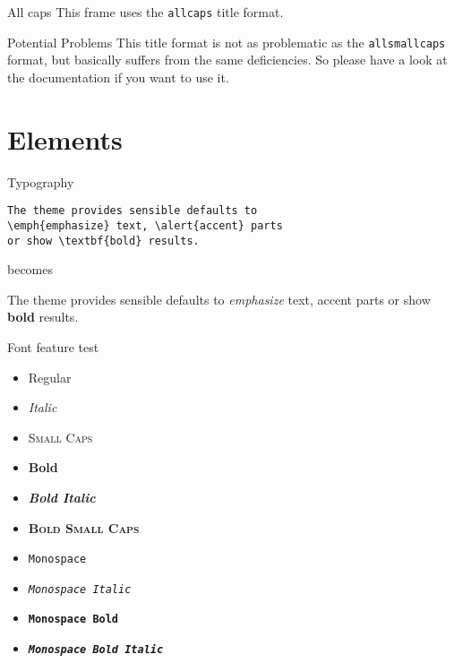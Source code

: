 \documentclass[10pt]{beamer}
\begin{document}
{
\begin{frame}{All caps}
    This frame uses the \texttt{allcaps} title format.

    \begin{alertblock}{Potential Problems}
        This title format is not as problematic as the \texttt{allsmallcaps} format, but basically suffers from the same deficiencies. So please have a look at the documentation if you want to use it.
    \end{alertblock}
\end{frame}
}

\section{Elements}

\begin{frame}[fragile]{Typography}
    \begin{verbatim}The theme provides sensible defaults to
\emph{emphasize} text, \alert{accent} parts
or show \textbf{bold} results.\end{verbatim}

    \begin{center}becomes\end{center}

    The theme provides sensible defaults to \emph{emphasize} text,
    \alert{accent} parts or show \textbf{bold} results.
\end{frame}

\begin{frame}{Font feature test}
    \begin{itemize}
        \item Regular
        \item \textit{Italic}
        \item \textsc{Small Caps}
        \item \textbf{Bold}
        \item \textbf{\textit{Bold Italic}}
        \item \textbf{\textsc{Bold Small Caps}}
        \item \texttt{Monospace}
        \item \texttt{\textit{Monospace Italic}}
        \item \texttt{\textbf{Monospace Bold}}
        \item \texttt{\textbf{\textit{Monospace Bold Italic}}}
    \end{itemize}
\end{frame}
\end{document}

